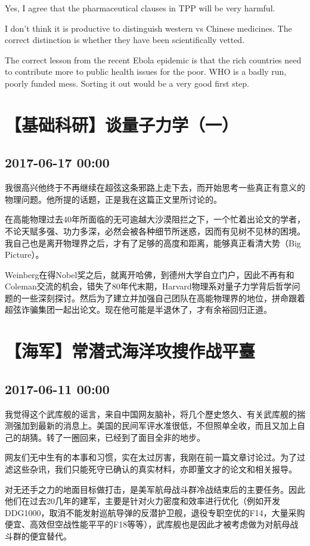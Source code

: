 \documentclass[twocolumn]{ctexart}
\begin{document}
Yes, I agree that the pharmaceutical clauses in TPP will be very harmful.

I don't think it is productive to distinguish western vs Chinese medicines. The correct distinction is whether they have been scientifically vetted.

 The correct lesson from the recent Ebola epidemic is that the rich countries need to contribute more to public health issues for the poor. WHO is a badly run, poorly funded mess. Sorting it out would be a very good first step.\section*{【基础科研】谈量子力学（一）}
\subsection*{2017-06-17 00:00}
我很高兴他终于不再继续在超弦这条邪路上走下去，而开始思考一些真正有意义的物理问题。他所提的话题，正是我在这篇正文里所讨论的。

在高能物理过去40年所面临的无可逾越大沙漠阻拦之下，一个忙着出论文的学者，不论天赋多强、功力多深，必然会被各种细节所迷惑，因而有见树不见林的困境。我自己也是离开物理界之后，才有了足够的高度和距离，能够真正看清大势（Big Picture）。

Weinberg在得Nobel奖之后，就离开哈佛，到德州大学自立门户，因此不再有和Coleman交流的机会，错失了80年代末期，Harvard物理系对量子力学背后哲学问题的一些深刻探讨。然后为了建立并加强自己团队在高能物理界的地位，拼命跟着超弦诈骗集团一起出论文。现在他可能是半退休了，才有余裕回归正道。\section*{【海军】常潜式海洋攻搜作战平臺}
\subsection*{2017-06-11 00:00}
我觉得这个武库舰的谣言，来自中国网友脑补，将几个歷史悠久、有关武库舰的揣测强加到最新的消息上。美国的民间军评水准很低，不但照单全收，而且又加上自己的胡猜。转了一圈回来，已经到了面目全非的地步。

网友们无中生有的本事和习惯，实在太过厉害，我刚在前一篇文章讨论过。为了过滤这些杂讯，我们只能死守已确认的真实材料，亦即董文才的论文和相关报导。

对无还手之力的地面目标做打击，是美军航母战斗群冷战结束后的主要任务。因此他们在过去20几年的建军，主要是针对火力密度和效率进行优化（例如开发DDG1000，取消不能发射巡航导弹的反潜护卫舰，退役专职空优的F14，大量采购便宜、高效但空战性能平平的F18等等），武库舰也是因此才被考虑做为对航母战斗群的便宜替代。
\end{document}
